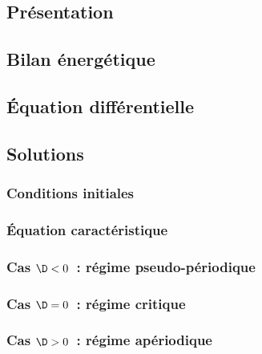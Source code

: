 \documentclass[../main/main.tex]{subfiles}
\begin{document}
\subsection{Présentation}

\subsection{Bilan énergétique}

\subsection{Équation différentielle}

\subsection{Solutions}
\subsubsection{Conditions initiales}
\subsubsection{Équation caractéristique}
\subsubsection{Cas $\D < 0$~: régime pseudo-périodique}
\subsubsection{Cas $\D = 0$~: régime critique}
\subsubsection{Cas $\D > 0$~: régime apériodique}
\end{document}
